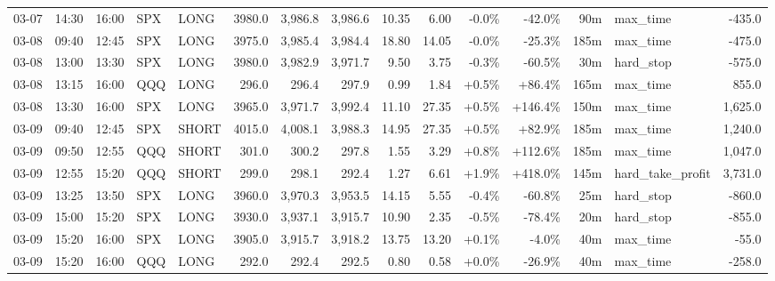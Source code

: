 \documentclass[11pt,a4paper,twoside]{article}
\begin{document}
\begin{landscape}
\begin{center}
\begin{longtable}{>{\color{txtmain}}l l l l l r r r r r r r r >{\color{txtmain}}l r}
03-07 & 14:30 & 16:00 & SPX & LONG & 3980.0 & 3,986.8 & 3,986.6 & 10.35 & 6.00 & \textcolor{lossred}{-0.0\%} & \textcolor{lossred}{-42.0\%} & 90m & max\_time & \textcolor{lossred}{-435.0} \\
03-08 & 09:40 & 12:45 & SPX & LONG & 3975.0 & 3,985.4 & 3,984.4 & 18.80 & 14.05 & \textcolor{lossred}{-0.0\%} & \textcolor{lossred}{-25.3\%} & 185m & max\_time & \textcolor{lossred}{-475.0} \\
03-08 & 13:00 & 13:30 & SPX & LONG & 3980.0 & 3,982.9 & 3,971.7 & 9.50 & 3.75 & \textcolor{lossred}{-0.3\%} & \textcolor{lossred}{-60.5\%} & 30m & hard\_stop & \textcolor{lossred}{-575.0} \\
03-08 & 13:15 & 16:00 & QQQ & LONG & 296.0 & 296.4 & 297.9 & 0.99 & 1.84 & \textcolor{wingreen}{+0.5\%} & \textcolor{wingreen}{+86.4\%} & 165m & max\_time & \textcolor{wingreen}{855.0} \\
03-08 & 13:30 & 16:00 & SPX & LONG & 3965.0 & 3,971.7 & 3,992.4 & 11.10 & 27.35 & \textcolor{wingreen}{+0.5\%} & \textcolor{wingreen}{+146.4\%} & 150m & max\_time & \textcolor{wingreen}{1,625.0} \\
03-09 & 09:40 & 12:45 & SPX & SHORT & 4015.0 & 4,008.1 & 3,988.3 & 14.95 & 27.35 & \textcolor{wingreen}{+0.5\%} & \textcolor{wingreen}{+82.9\%} & 185m & max\_time & \textcolor{wingreen}{1,240.0} \\
03-09 & 09:50 & 12:55 & QQQ & SHORT & 301.0 & 300.2 & 297.8 & 1.55 & 3.29 & \textcolor{wingreen}{+0.8\%} & \textcolor{wingreen}{+112.6\%} & 185m & max\_time & \textcolor{wingreen}{1,047.0} \\
03-09 & 12:55 & 15:20 & QQQ & SHORT & 299.0 & 298.1 & 292.4 & 1.27 & 6.61 & \textcolor{wingreen}{+1.9\%} & \textcolor{wingreen}{+418.0\%} & 145m & hard\_take\_profit & \textcolor{wingreen}{3,731.0} \\
03-09 & 13:25 & 13:50 & SPX & LONG & 3960.0 & 3,970.3 & 3,953.5 & 14.15 & 5.55 & \textcolor{lossred}{-0.4\%} & \textcolor{lossred}{-60.8\%} & 25m & hard\_stop & \textcolor{lossred}{-860.0} \\
03-09 & 15:00 & 15:20 & SPX & LONG & 3930.0 & 3,937.1 & 3,915.7 & 10.90 & 2.35 & \textcolor{lossred}{-0.5\%} & \textcolor{lossred}{-78.4\%} & 20m & hard\_stop & \textcolor{lossred}{-855.0} \\
03-09 & 15:20 & 16:00 & SPX & LONG & 3905.0 & 3,915.7 & 3,918.2 & 13.75 & 13.20 & \textcolor{wingreen}{+0.1\%} & \textcolor{lossred}{-4.0\%} & 40m & max\_time & \textcolor{lossred}{-55.0} \\
03-09 & 15:20 & 16:00 & QQQ & LONG & 292.0 & 292.4 & 292.5 & 0.80 & 0.58 & \textcolor{wingreen}{+0.0\%} & \textcolor{lossred}{-26.9\%} & 40m & max\_time & \textcolor{lossred}{-258.0} \\

\end{longtable}
\end{center}
\end{landscape}
\end{document}
